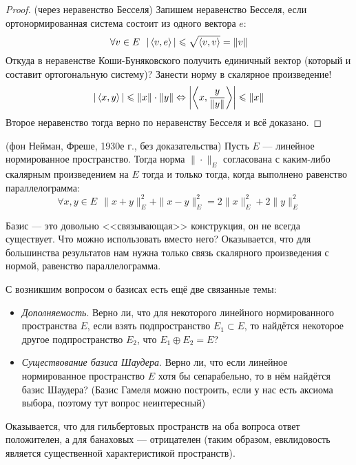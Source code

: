 \begin{proof} (через неравенство Бесселя)
	Запишем неравенство Бесселя, если ортонормированная система состоит из одного вектора $e$:
	\[
		\forall v \in E\ \ |\left\langle v, e\right\rangle| \leqslant \sqrt{\left\langle v, v\right\rangle} = \|v\|
	\]
	Откуда в неравенстве Коши-Буняковского получить единичный вектор (который и составит ортогональную систему)? Занести норму в скалярное произведение!
	\[
		|\left\langle x, y\right\rangle| \leqslant \|x\| \cdot \|y\| \Leftrightarrow \left|\left\langle x, \frac{y}{\|y\|}\right\rangle\right| \leqslant \|x\|
	\]
	Второе неравенство тогда верно по неравенству Бесселя и всё доказано.
\end{proof}

\begin{theorem} (фон Нейман, Фреше, 1930е г., без доказательства)
	Пусть $E$ --- линейное нормированное пространство. Тогда норма $\|\cdot\|_E$ согласована с каким-либо скалярным произведением на $E$ тогда и только тогда, когда выполнено равенство параллелограмма:
	\[
		\forall x, y \in E\ \ \|x + y\|_E^2 + \|x - y\|_E^2 = 2\|x\|_E^2 + 2\|y\|_E^2
	\]
\end{theorem}

\begin{note}
	Базис --- это довольно <<связывающая>> конструкция, он не всегда существует. Что можно использовать вместо него? Оказывается, что для большинства результатов нам нужна только связь скалярного произведения с нормой, равенство параллелограмма.
\end{note}

\begin{note}
	С возникшим вопросом о базисах есть ещё две связанные темы:
	\begin{itemize}
		\item \textit{Дополняемость}. Верно ли, что для некоторого линейного нормированного пространства $E$, если взять подпространство $E_1 \subset E$, то найдётся некоторое другое подпространство $E_2$, что $E_1 \oplus E_2 = E$?
		
		\item \textit{Существование базиса Шаудера}. Верно ли, что если линейное нормированное пространство $E$ хотя бы сепарабельно, то в нём найдётся базис Шаудера? (Базис Гамеля можно построить, если у нас есть аксиома выбора, поэтому тут вопрос неинтересный)
	\end{itemize}
	Оказывается, что для гильбертовых пространств на оба вопроса ответ положителен, а для банаховых --- отрицателен (таким образом, евклидовость является существенной характеристикой пространств).
\end{note}


